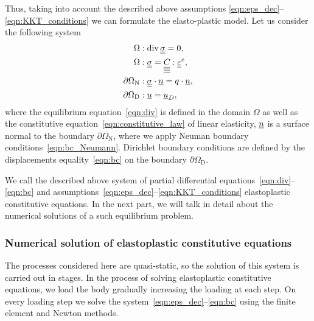 \documentclass[12pt]{article}
\begin{document}
Thus, taking into account the described above assumptions \ref{eqn:eps_dec}--\ref{eqn:KKT_conditions} we can formulate the elasto-plastic model. Let us consider the following system
\begin{align}
    \Omega &: \operatorname{div} \underline{\underline{\sigma}} = 0 , \label{eqn:div}\\
    \Omega &: \underline{\underline{\sigma}} = \underline{\underline{\underline{\underline{C_{}}}}} : \underline{\underline{\varepsilon}}^e, \label{eqn:constitutive_law}\\
    \partial\Omega_\text{N} &: \underline{\underline{\sigma}} \cdot \underline{n} = q \cdot \underline{n}, \label{eqn:bc_Neumann} \\
    \partial\Omega_\text{D} &: \underline{u} = \underline{u}_D, \label{eqn:bc}
\end{align}
where the equilibrium equation~\ref{eqn:div} is defined in the domain $\Omega$ as well as the constitutive equation~\ref{eqn:constitutive_law} of linear elasticity, $\underline{n}$ is a surface normal to the boundary $\partial\Omega_\text{N}$, where we apply Neuman boundary conditions~\ref{eqn:bc_Neumann}. Dirichlet boundary conditions are defined by the displacements equality~\ref{eqn:bc} on the boundary $\partial\Omega_\text{D}$.

We call the described above system of partial differential equations~\ref{eqn:div}--\ref{eqn:bc} and assumptions~\ref{eqn:eps_dec}--\ref{eqn:KKT_conditions} elastoplastic constitutive equations. In the next part, we will talk in detail about the numerical solutions of a such equilibrium problem.

\subsubsection{Numerical solution of elastoplastic constitutive equations}

The processes considered here are quasi-static, so the solution of this system is carried out in stages. In the process of solving elastoplastic constitutive equations, we load the body gradually increasing the loading at each step. On every loading step we solve the system~\ref{eqn:eps_dec}--\ref{eqn:bc} using the finite element and Newton methods. 
\end{document}
